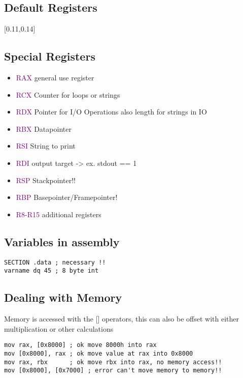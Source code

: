 \documentclass[main.tex,fontsize=8pt,paper=a4,paper=landscape,DIV=calc,]{scrartcl}
\begin{document}
\begin{multicols*}{4}
\subsection{Default Registers}
[0.11,0.14]

\subsection{Special Registers}
\begin{itemize}
  \item \textcolor{purple}{RAX} general use register
  \item \textcolor{purple}{RCX} Counter for loops or strings
  \item \textcolor{purple}{RDX} Pointer for I/O Operations\newline
    also length for strings in IO
  \item \textcolor{purple}{RBX} Datapointer
  \item \textcolor{purple}{RSI} String to print
  \item \textcolor{purple}{RDI} output target -> ex. stdout == 1
  \item \textcolor{purple}{RSP} Stackpointer!!
  \item \textcolor{purple}{RBP} Basepointer/Framepointer!
  \item \textcolor{purple}{R8-R15} additional registers
\end{itemize}

\subsection{Variables in assembly}
\vspace{-2.5mm}
\begin{lstlisting}
SECTION .data ; necessary !!
varname dq 45 ; 8 byte int
\end{lstlisting}
\vspace{2mm}

\subsection{Dealing with Memory}
Memory is accessed with the [] operators, this can also be offset with either multiplication or other calculations
\vspace{-2.5mm}
\begin{lstlisting}
mov rax, [0x8000] ; ok move 8000h into rax
mov [0x8000], rax ; ok move value at rax into 0x8000
mov rax, rbx      ; ok move rbx into rax, no memory access!!
mov [0x8000], [0x7000] ; error can't move memory to memory!!
\end{lstlisting}
\vspace{2mm}


\end{multicols*}
\end{document}

